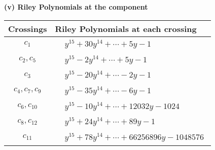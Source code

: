 \documentclass[1p]{elsarticle_modified}
\theoremstyle{definition}
\begin{document}
\newpage\renewcommand{\arraystretch}{1}
\flushleft \textbf{(v) Riley Polynomials at the component}\newline \\
\begin{tabular}{m{50pt}|m{274pt}}
Crossings & \hspace{64pt}Riley Polynomials at each crossing \\
\hline $$\begin{aligned}c_{1}\end{aligned}$$&$\begin{aligned}
&y^{15}+30 y^{14}+\cdots+5 y-1
\end{aligned}$\\
\hline $$\begin{aligned}c_{2},c_{5}\end{aligned}$$&$\begin{aligned}
&y^{15}-2 y^{14}+\cdots+5 y-1
\end{aligned}$\\
\hline $$\begin{aligned}c_{3}\end{aligned}$$&$\begin{aligned}
&y^{15}-20 y^{14}+\cdots-2 y-1
\end{aligned}$\\
\hline $$\begin{aligned}c_{4},c_{7},c_{9}\end{aligned}$$&$\begin{aligned}
&y^{15}-35 y^{14}+\cdots-6 y-1
\end{aligned}$\\
\hline $$\begin{aligned}c_{6},c_{10}\end{aligned}$$&$\begin{aligned}
&y^{15}-10 y^{14}+\cdots+12032 y-1024
\end{aligned}$\\
\hline $$\begin{aligned}c_{8},c_{12}\end{aligned}$$&$\begin{aligned}
&y^{15}+24 y^{14}+\cdots+89 y-1
\end{aligned}$\\
\hline $$\begin{aligned}c_{11}\end{aligned}$$&$\begin{aligned}
&y^{15}+78 y^{14}+\cdots+66256896 y-1048576
\end{aligned}$\\
\hline
\end{tabular}\\~\\
\end{document}
